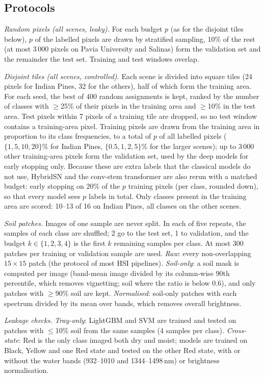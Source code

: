 \documentclass[]{interact}
\begin{document}
\subsection{Protocols}\label{sec:protocol}
\emph{Random pixels (all scenes, leaky).} For each budget $p$ (as for the disjoint tiles below), $p$ of the labelled pixels are drawn by stratified sampling, 10\% of the rest (at most 3\,000 pixels on Pavia University and Salinas) form the validation set and the remainder the test set. Training and test windows overlap.

\emph{Disjoint tiles (all scenes, controlled).} Each scene is divided into square tiles (24 pixels for Indian Pines, 32 for the others), half of which form the training area. For each seed, the best of 400 random assignments is kept, ranked by the number of classes with $\ge$25\% of their pixels in the training area and $\ge$10\% in the test area. Test pixels within 7 pixels of a training tile are dropped, so no test window contains a training-area pixel. Training pixels are drawn from the training area in proportion to its class frequencies, to a total of $p$ of all labelled pixels ($\{1,5,10,20\}\%$ for Indian Pines, $\{0.5,1,2,5\}\%$ for the larger scenes); up to 3\,000 other training-area pixels form the validation set, used by the deep models for early stopping only. Because these are extra labels that the classical models do not use, HybridSN and the conv-stem transformer are also rerun with a matched budget: early stopping on 20\% of the $p$ training pixels (per class, rounded down), so that every model sees $p$ labels in total. Only classes present in the training area are scored: 10--13 of 16 on Indian Pines, all classes on the other scenes.

\emph{Soil patches.} Images of one sample are never split. In each of five repeats, the samples of each class are shuffled; 2 go to the test set, 1 to validation, and the budget $k\in\{1,2,3,4\}$ is the first $k$ remaining samples per class. At most 300 patches per training or validation sample are used. \emph{Raw}: every non-overlapping $15\times15$ patch (the protocol of most HSI pipelines). \emph{Soil-only}: a soil mask is computed per image (band-mean image divided by its column-wise 90th percentile, which removes vignetting; soil where the ratio is below 0.6), and only patches with $\ge$90\% soil are kept. \emph{Normalised}: soil-only patches with each spectrum divided by its mean over bands, which removes overall brightness.

\emph{Leakage checks.} \emph{Tray-only}: LightGBM and SVM are trained and tested on patches with $\le$10\% soil from the same samples (4 samples per class). \emph{Cross-state}: Red is the only class imaged both dry and moist; models are trained on Black, Yellow and one Red state and tested on the other Red state, with or without the water bands (932--1010 and 1344--1498\,nm) or brightness normalisation.
\end{document}
